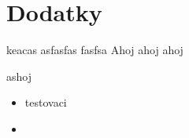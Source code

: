 \documentclass[12pt,a4paper]{report} %
\begin{document}





\appendix

\chapter{Dodatky}
\label{chap:dodatky}








keacas
asfasfas
fasfsa
Ahoj ahoj ahoj

ashoj


\begin{itemize}
	\item testovaci
		\item

\end{itemize}
\end{document}
